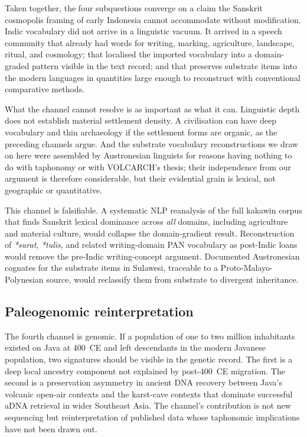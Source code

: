 \documentclass[12pt,a4paper]{article}
\begin{document}
Taken together, the four subquestions converge on a claim the Sanskrit cosmopolis framing of early Indonesia cannot accommodate without modification. Indic vocabulary did not arrive in a linguistic vacuum. It arrived in a speech community that already had words for writing, marking, agriculture, landscape, ritual, and cosmology; that localised the imported vocabulary into a domain-graded pattern visible in the text record; and that preserves substrate items into the modern languages in quantities large enough to reconstruct with conventional comparative methods.

What the channel cannot resolve is as important as what it can. Linguistic depth does not establish material settlement density. A civilisation can have deep vocabulary and thin archaeology if the settlement forms are organic, as the preceding channels argue. And the substrate vocabulary reconstructions we draw on here were assembled by Austronesian linguists for reasons having nothing to do with taphonomy or with VOLCARCH's thesis; their independence from our argument is therefore considerable, but their evidential grain is lexical, not geographic or quantitative.

This channel is falsifiable. A systematic NLP reanalysis of the full kakawin corpus that finds Sanskrit lexical dominance across \textit{all} domains, including agriculture and material culture, would collapse the domain-gradient result. Reconstruction of \textit{*surat}, \textit{*tulis}, and related writing-domain PAN vocabulary as post-Indic loans would remove the pre-Indic writing-concept argument. Documented Austronesian cognates for the substrate items in Sulawesi, traceable to a Proto-Malayo-Polynesian source, would reclassify them from substrate to divergent inheritance.


\subsection{Paleogenomic reinterpretation}
\label{sec:ch4}

The fourth channel is genomic. If a population of one to two million inhabitants existed on Java at 400~CE and left descendants in the modern Javanese population, two signatures should be visible in the genetic record. The first is a deep local ancestry component not explained by post-400~CE migration. The second is a preservation asymmetry in ancient DNA recovery between Java's volcanic open-air contexts and the karst-cave contexts that dominate successful aDNA retrieval in wider Southeast Asia. The channel's contribution is not new sequencing but reinterpretation of published data whose taphonomic implications have not been drawn out.
\end{document}
